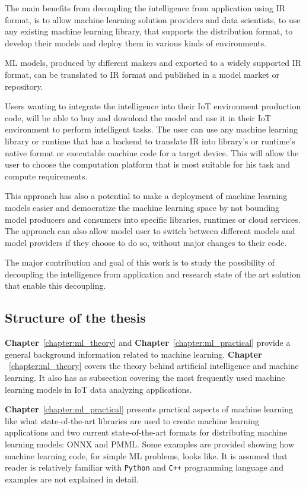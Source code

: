 \documentclass[english, 12pt, a4paper, elec, utf8, online]{aaltothesis}
\begin{document}
The main benefits from decoupling the intelligence from application using IR format, is to allow machine learning solution providers and data scientists, to use any existing machine learning library, that supports the distribution format, to develop their models and deploy them in various kinds of environments.

ML models, produced by different makers and exported to a widely supported IR format, can be translated to IR format and published in a model market or repository. 

Users wanting to integrate the intelligence into their IoT environment production code, will be able to buy and download the model and use it in their IoT environment to perform intelligent tasks. The user can use any machine learning library or runtime that has a backend to translate IR into library's or runtime's native format or executable machine code for a target device. This will allow the user to choose the computation platform that is most suitable for his task and compute requirements.

This approach has also a potential to make a deployment of machine learning models easier and democratize the machine learning space by not bounding model producers and consumers into specific libraries, runtimes or cloud services. The approach can also allow model user to switch between different models and model providers if they choose to do so, without major changes to their code.

The major contribution and goal of this work is to study the possibility of decoupling the intelligence from application and research state of the art solution that enable this decoupling.

\subsection{Structure of the thesis}
\textbf{Chapter}~\ref{chapter:ml_theory} and \textbf{Chapter}~\ref{chapter:ml_practical} provide a general background information related to machine learning. \textbf{Chapter} ~\ref{chapter:ml_theory} covers the theory behind artificial intelligence and machine learning. It also has as subsection covering the most frequently used machine learning models in IoT data analyzing applications.

 \textbf{Chapter}~\ref{chapter:ml_practical} presents practical aspects of machine learning like what state-of-the-art libraries are used to create machine learning applications and two current state-of-the-art formats for distributing machine learning models: ONNX and PMML. Some examples are provided showing how machine learning code, for simple ML problems, looks like. It is assumed that reader is relatively familiar with \texttt{Python} and \texttt{C++} programming language and examples are not explained in detail.  
\end{document}
